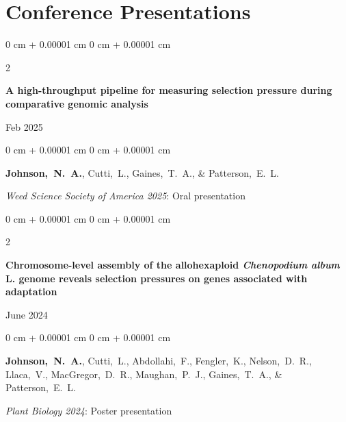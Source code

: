 \documentclass[10pt, letterpaper]{article}
\newenvironment{onecolentry}{
    \begin{adjustwidth}{
        0 cm + 0.00001 cm
    }{
        0 cm + 0.00001 cm
    }
}{
    \end{adjustwidth}
} %
\newenvironment{twocolentry}[2][]{
    \onecolentry
    \def\secondColumn{#2}
    \setcolumnwidth{\fill, 4.5 cm}
    \begin{paracol}{2}
}{
    \switchcolumn \raggedleft \secondColumn
    \end{paracol}
    \endonecolentry
} %
\begin{document}
        

    \section{Conference Presentations}




        \begin{samepage}
            \begin{twocolentry}{
                Feb 2025
                }
                \textbf{A high-throughput pipeline for measuring selection pressure during comparative genomic analysis}
            \end{twocolentry}

            \vspace{0.10 cm}
            
            \begin{onecolentry}
                \mbox{\textbf{Johnson, N. A.}}, \mbox{Cutti, L.}, \mbox{Gaines, T. A.}, \& \mbox{Patterson, E. L.}

                \vspace{0.10 cm}
                
                \textit{Weed Science Society of America 2025}: Oral presentation
            \end{onecolentry}
        \end{samepage}


        \vspace{0.2 cm}

        
        \begin{samepage}
            \begin{twocolentry}{
                June 2024
                }
                \textbf{Chromosome-level assembly of the allohexaploid \textit{Chenopodium album} L. genome reveals selection pressures on genes associated with adaptation}
            \end{twocolentry}

            \vspace{0.10 cm}
            
            \begin{onecolentry}
                \mbox{\textbf{Johnson, N. A.}}, \mbox{Cutti, L.}, \mbox{Abdollahi, F.}, \mbox{Fengler, K.}, \mbox{Nelson, D. R.}, \mbox{Llaca, V.}, \mbox{MacGregor, D. R.}, \mbox{Maughan, P. J.}, \mbox{Gaines, T. A.}, \& \mbox{Patterson, E. L.}

                \vspace{0.10 cm}
                
                \textit{Plant Biology 2024}: Poster presentation
            \end{onecolentry}
        \end{samepage}
\end{document}
